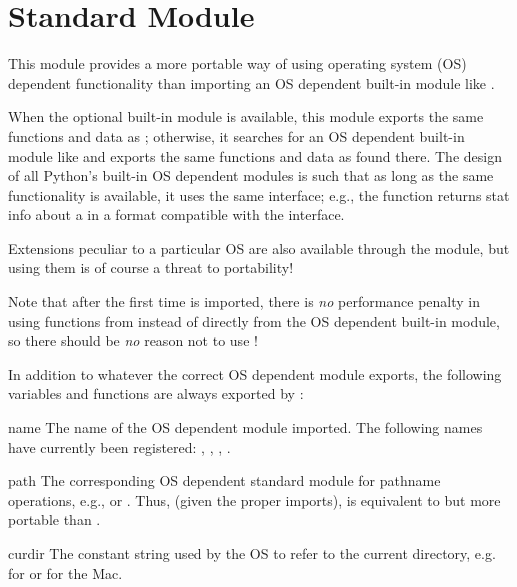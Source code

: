 \section{Standard Module }
\label{module-os}

This module provides a more portable way of using operating system
(OS) dependent functionality than importing an OS dependent built-in
module like .

When the optional built-in module  is available, this
module exports the same functions and data as ; otherwise,
it searches for an OS dependent built-in module like  and
exports the same functions and data as found there.  The design of all
Python's built-in OS dependent modules is such that as long as the same
functionality is available, it uses the same interface; e.g., the
function  returns stat info about a  in a
format compatible with the \POSIX{} interface.

Extensions peculiar to a particular OS are also available through the
 module, but using them is of course a threat to portability!

Note that after the first time  is imported, there is \emph{no}
performance penalty in using functions from  instead of
directly from the OS dependent built-in module, so there should be
\emph{no} reason not to use !

In addition to whatever the correct OS dependent module exports, the
following variables and functions are always exported by :

\renewcommand{\indexsubitem}{(in module os)}

\begin{datadesc}{name}
The name of the OS dependent module imported.  The following names
have currently been registered: , ,
, .
\end{datadesc}

\begin{datadesc}{path}
The corresponding OS dependent standard module for pathname
operations, e.g.,  or .  Thus, (given
the proper imports),  is equivalent to but
more portable than .
\end{datadesc}

\begin{datadesc}{curdir}
The constant string used by the OS to refer to the current directory,
e.g.  for \POSIX{} or  for the Mac.
\end{datadesc}

